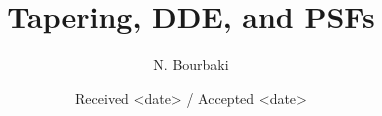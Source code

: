 \documentclass[]{aa}
\begin{document}
      
	      
\title{Tapering, DDE, and PSFs}

\subtitle{}
\author{N. Bourbaki}%

\date{Received <date> / Accepted <date>}


\abstract{
}




   \maketitle











\end{document}
